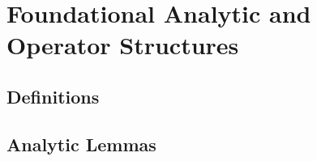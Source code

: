 \section{Foundational Analytic and Operator Structures}
\label{sec:foundations}




\subsection{Definitions}










\subsection{Analytic Lemmas}
















